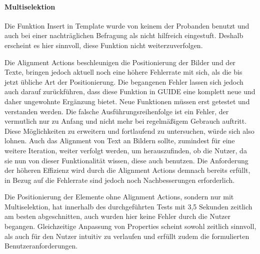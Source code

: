 \paragraph{Multiselektion}
Die Funktion \glqq Insert in Template\grqq{} wurde von keinem der Probanden benutzt und auch bei einer nachträglichen Befragung als nicht hilfreich eingestuft.
Deshalb erscheint es hier sinnvoll, diese Funktion nicht weiterzuverfolgen.

Die Alignment Actions beschleunigen die Positionierung der Bilder und der Texte, bringen jedoch aktuell noch eine höhere Fehlerrate mit sich, als die bis jetzt übliche Art der Positionierung.
Die begangenen Fehler lassen sich jedoch auch darauf zurückführen, dass diese Funktion in GUIDE eine komplett neue und daher ungewohnte Ergänzung bietet.
Neue Funktionen müssen erst getestet und verstanden werden.
Die falsche Ausführungsreihenfolge ist ein Fehler, der vermutlich nur zu Anfang und nicht mehr bei regelmäßigem Gebrauch auftritt.
Diese Möglichkeiten zu erweitern und fortlaufend zu untersuchen, würde sich also lohnen.
Auch das Alignment von Text an Bildern sollte, zumindest für eine weitere Iteration, weiter verfolgt werden, um herauszufinden, ob die Nutzer, da sie nun von dieser Funktionalität wissen, diese auch benutzen.
Die Anforderung der höheren Effizienz wird durch die Alignment Actions demnach bereits erfüllt, in Bezug auf die Fehlerrate sind jedoch noch Nachbesserungen erforderlich.

Die Positionierung der Elemente ohne Alignment Actions, sondern nur mit Multiselektion, hat innerhalb des durchgeführten Tests  mit 3,5 Sekunden zeitlich am besten abgeschnitten, auch wurden hier keine Fehler durch die Nutzer begangen.
Gleichzeitige Anpassung von Properties scheint sowohl zeitlich sinnvoll, als auch für den Nutzer intuitiv zu verlaufen und erfüllt zudem die formulierten Benutzeranforderungen.

